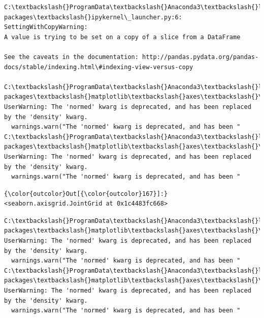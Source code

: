 \documentclass[11pt]{article}
\begin{document}
    \begin{Verbatim}[commandchars=\\\{\}]
C:\textbackslash{}ProgramData\textbackslash{}Anaconda3\textbackslash{}lib\textbackslash{}site-packages\textbackslash{}ipykernel\_launcher.py:6: SettingWithCopyWarning: 
A value is trying to be set on a copy of a slice from a DataFrame

See the caveats in the documentation: http://pandas.pydata.org/pandas-docs/stable/indexing.html\#indexing-view-versus-copy
  
C:\textbackslash{}ProgramData\textbackslash{}Anaconda3\textbackslash{}lib\textbackslash{}site-packages\textbackslash{}matplotlib\textbackslash{}axes\textbackslash{}\_axes.py:6462: UserWarning: The 'normed' kwarg is deprecated, and has been replaced by the 'density' kwarg.
  warnings.warn("The 'normed' kwarg is deprecated, and has been "
C:\textbackslash{}ProgramData\textbackslash{}Anaconda3\textbackslash{}lib\textbackslash{}site-packages\textbackslash{}matplotlib\textbackslash{}axes\textbackslash{}\_axes.py:6462: UserWarning: The 'normed' kwarg is deprecated, and has been replaced by the 'density' kwarg.
  warnings.warn("The 'normed' kwarg is deprecated, and has been "

    \end{Verbatim}

\begin{Verbatim}[commandchars=\\\{\}]
{\color{outcolor}Out[{\color{outcolor}167}]:} <seaborn.axisgrid.JointGrid at 0x1c4483fc668>
\end{Verbatim}
            
    \begin{Verbatim}[commandchars=\\\{\}]
C:\textbackslash{}ProgramData\textbackslash{}Anaconda3\textbackslash{}lib\textbackslash{}site-packages\textbackslash{}matplotlib\textbackslash{}axes\textbackslash{}\_axes.py:6462: UserWarning: The 'normed' kwarg is deprecated, and has been replaced by the 'density' kwarg.
  warnings.warn("The 'normed' kwarg is deprecated, and has been "
C:\textbackslash{}ProgramData\textbackslash{}Anaconda3\textbackslash{}lib\textbackslash{}site-packages\textbackslash{}matplotlib\textbackslash{}axes\textbackslash{}\_axes.py:6462: UserWarning: The 'normed' kwarg is deprecated, and has been replaced by the 'density' kwarg.
  warnings.warn("The 'normed' kwarg is deprecated, and has been "

    \end{Verbatim}
\end{document}

